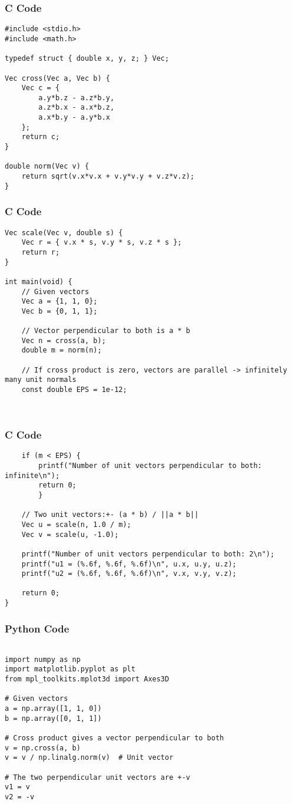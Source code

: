 \documentclass{beamer}
\begin{document}
\begin{frame}[fragile]
    \frametitle{C Code}
    \begin{lstlisting}
#include <stdio.h>
#include <math.h>

typedef struct { double x, y, z; } Vec;

Vec cross(Vec a, Vec b) {
    Vec c = {
        a.y*b.z - a.z*b.y,
        a.z*b.x - a.x*b.z,
        a.x*b.y - a.y*b.x
    };
    return c;
}

double norm(Vec v) {
    return sqrt(v.x*v.x + v.y*v.y + v.z*v.z);
}
     \end{lstlisting}
\end{frame}
\begin{frame}[fragile]
    \frametitle{C Code }
    \begin{lstlisting}
Vec scale(Vec v, double s) {
    Vec r = { v.x * s, v.y * s, v.z * s };
    return r;
}

int main(void) {
    // Given vectors
    Vec a = {1, 1, 0};
    Vec b = {0, 1, 1};

    // Vector perpendicular to both is a * b
    Vec n = cross(a, b);
    double m = norm(n);

    // If cross product is zero, vectors are parallel -> infinitely many unit normals
    const double EPS = 1e-12;
    
        
    \end{lstlisting}
    \end{frame}
    \begin{frame}[fragile]
    \frametitle{C Code }
    \begin{lstlisting}
    if (m < EPS) {
        printf("Number of unit vectors perpendicular to both: infinite\n");
        return 0;
        }

    // Two unit vectors:+- (a * b) / ||a * b||
    Vec u = scale(n, 1.0 / m);
    Vec v = scale(u, -1.0);

    printf("Number of unit vectors perpendicular to both: 2\n");
    printf("u1 = (%.6f, %.6f, %.6f)\n", u.x, u.y, u.z);
    printf("u2 = (%.6f, %.6f, %.6f)\n", v.x, v.y, v.z);

    return 0;
}
     \end{lstlisting}
    \end{frame}


\begin{frame}[fragile]
    \frametitle{Python Code}
    \begin{lstlisting}

import numpy as np
import matplotlib.pyplot as plt
from mpl_toolkits.mplot3d import Axes3D

# Given vectors
a = np.array([1, 1, 0])
b = np.array([0, 1, 1])

# Cross product gives a vector perpendicular to both
v = np.cross(a, b)
v = v / np.linalg.norm(v)  # Unit vector

# The two perpendicular unit vectors are +-v
v1 = v
v2 = -v


    \end{lstlisting}
\end{frame}
\end{document}
